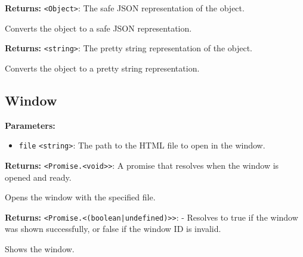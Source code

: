 \documentclass[12pt,a4paper]{article}
\begin{document}
\vspace{5mm}
\noindent {}


\noindent \textbf{Returns:} \texttt{<Object>}: The safe JSON representation of the object.

\noindent Converts the object to a safe JSON representation.

\vspace{5mm}
\noindent {}


\noindent \textbf{Returns:} \texttt{<string>}: The pretty string representation of the object.

\noindent Converts the object to a pretty string representation.


\subsection{Window}
\vspace{5mm}
\noindent {}


\noindent \textbf{Parameters:}
\begin{itemize}
  \item \texttt{file} \texttt{<string>}: The path to the HTML file to open in the window.
\end{itemize}

\noindent \textbf{Returns:} \texttt{<Promise.<void>>}: A promise that resolves when the window is opened and ready.

\noindent Opens the window with the specified file.

\vspace{5mm}
\noindent {}


\noindent \textbf{Returns:} \texttt{<Promise.<(boolean|undefined)>>}: - Resolves to \textasciigrave{}true\textasciigrave{} if the window was shown successfully, or \textasciigrave{}false\textasciigrave{} if the window ID is invalid.

\noindent Shows the window.
\end{document}

